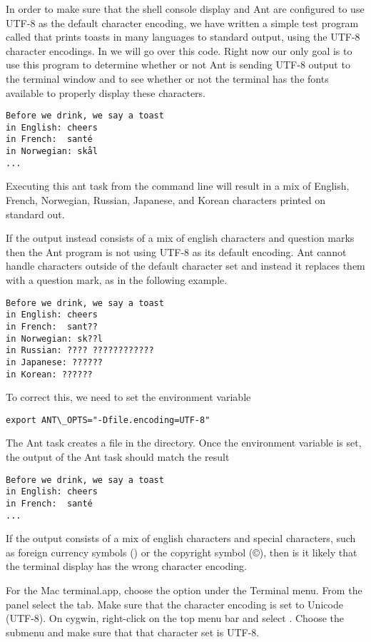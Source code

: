In order to make sure that the shell console display and Ant are
configured to use UTF-8 as the default character encoding, we have written
a simple test program called  that prints toasts in many
languages to standard output, using the UTF-8 character encodings.
In  we will go over this code.
Right now our only goal is to use this program to determine whether or not
Ant is sending UTF-8 output to the terminal window and to see whether or not
the terminal has the fonts available to properly display these characters.
\begin{verbatim}
Before we drink, we say a toast 
in English: cheers  
in French:  santé
in Norwegian: skål
...
\end{verbatim}
Executing this ant task from the command line will result in a mix of
English, French, Norwegian, Russian, Japanese, and Korean characters
printed on standard out.

If the output instead consists of a mix of english characters and question marks
then the Ant program is not using UTF-8 as its default encoding.  Ant cannot handle
characters outside of the default character set and instead it replaces them with
a question mark, as in the following example.
\begin{verbatim}
Before we drink, we say a toast 
in English: cheers  
in French:  sant??
in Norwegian: sk??l
in Russian: ???? ????????????
in Japanese: ??????
in Korean: ??????
\end{verbatim} 
To correct this, we need to set the  environment variable
\begin{verbatim} 
export ANT\_OPTS="-Dfile.encoding=UTF-8"
\end{verbatim}
The Ant  task creates a file  in the 
 directory.
Once the  environment variable is set, the output of the Ant
 task should match the result
\begin{verbatim}
Before we drink, we say a toast
in English: cheers
in French:  santé
...
\end{verbatim}

If the output consists of a mix of english characters and special characters,
such as foreign currency symbols ({\textyen})  or the copyright symbol ({\copyright}),
then is it likely that the terminal display has the wrong character encoding.

For the Mac terminal.app, choose the  option under
the Terminal menu.  From the  panel select the  tab.
Make sure that the character encoding is set to Unicode (UTF-8).
On cygwin, right-click on the top menu bar and select .
Choose the  submenu and make sure that that character set is UTF-8.

